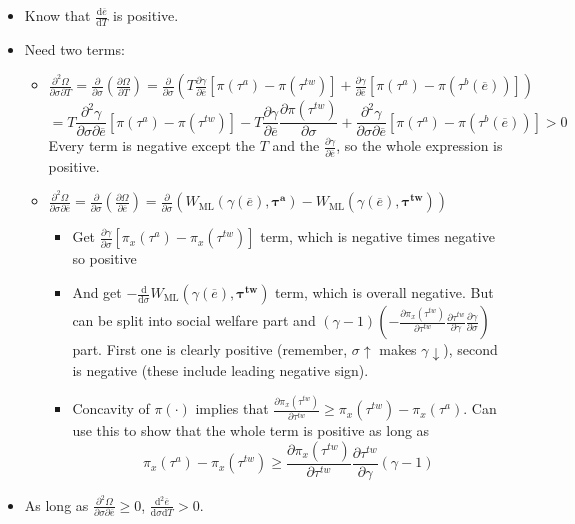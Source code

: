 \documentclass[12pt]{article}
\newcommand{\ov}{\overline}
\newcommand{\bta}{\bm{\tau^a}}
\newcommand{\btw}{\bm{\tau^{tw}}}
\newcommand{\ga}{\gamma}
\begin{document}
\begin{itemize}
	\item Know that $\frac{\mathrm{d} \ov{e}}{\mathrm{d} T}$ is positive.
	\item Need two terms:
		\begin{itemize}
			\item $\frac{\partial^2 \Omega}{\partial \sigma \partial T} = \frac{\partial}{\partial \sigma} \left(\frac{\partial \Omega}{\partial T} \right) = \frac{\partial}{\partial \sigma}\left(T\frac{\partial \ga}{\partial \ov{e}}\left[ \pi(\tau^a)-\pi(\tau^{tw}) \right] + \frac{\partial \ga}{\partial \ov{e}}\left[ \pi(\tau^{a}) - \pi(\tau^b(\ov{e})) \right] \right)$
			\[
			  = T\frac{\partial^2 \ga}{\partial \sigma \partial \ov{e}}\left[ \pi(\tau^a)-\pi(\tau^{tw}) \right] - T \frac{\partial \ga}{\partial \ov{e}} \frac{\partial \pi(\tau^{tw})}{\partial \sigma}+ \frac{\partial^2 \ga}{\partial \sigma \partial \ov{e}}\left[ \pi(\tau^{a}) - \pi(\tau^b(\ov{e})) \right] > 0
			\]
			Every term is negative except the $T$ and the $\frac{\partial \ga}{\partial \ov{e}}$, so the whole expression is positive.
			\item $\frac{\partial^2 \Omega}{\partial \sigma \partial \ov{e}} = \frac{\partial}{\partial \sigma}\left(\frac{\partial \Omega}{\partial \ov{e}}\right) = \frac{\partial}{\partial \sigma}\left( W_\text{ML}(\ga(\ov{e}),\bta) - W_\text{ML}(\ga(\ov{e}),\btw)\right)$
				\begin{itemize}
					\item Get $\frac{\partial \ga}{\partial \sigma}\left[\pi_x(\tau^a) - \pi_x(\tau^{tw})\right]$ term, which is negative times negative so positive
					\item And get $-\frac{\mathrm{d}}{\mathrm{d} \sigma} W_\text{ML}(\ga(\ov{e}),\btw)$ term, which is overall negative. But can be split into social welfare part and $(\ga-1)\left(-\frac{\partial\pi_x(\tau^{tw})}{\partial \tau^{tw}}\frac{\partial \tau^{tw}}{\partial \ga}\frac{\partial \ga}{\partial \sigma} \right)$ part. First one is clearly positive (remember, $\sigma \uparrow$ makes $\gamma \downarrow$), second is negative (these include leading negative sign).
					\item Concavity of $\pi(\cdot)$ implies that $\frac{\partial\pi_x(\tau^{tw})}{\partial \tau^{tw}} \geq \pi_x(\tau^{tw}) - \pi_x(\tau^a)$. Can use this to show that the whole term is positive as long as
						\[
						  \pi_x(\tau^a) - \pi_x(\tau^{tw}) \geq \frac{\partial\pi_x(\tau^{tw})}{\partial \tau^{tw}} \frac{\partial \tau^{tw}}{\partial \ga} (\ga - 1)
						\]
				\end{itemize}
		\end{itemize}
	\item As long as $\frac{\partial^2 \Omega}{\partial \sigma \partial \ov{e}} \geq 0$, $\frac{\mathrm{d}^2 \ov{e}}{\mathrm{d} \sigma \mathrm{d} T} > 0$.
\end{itemize}
\end{document}
